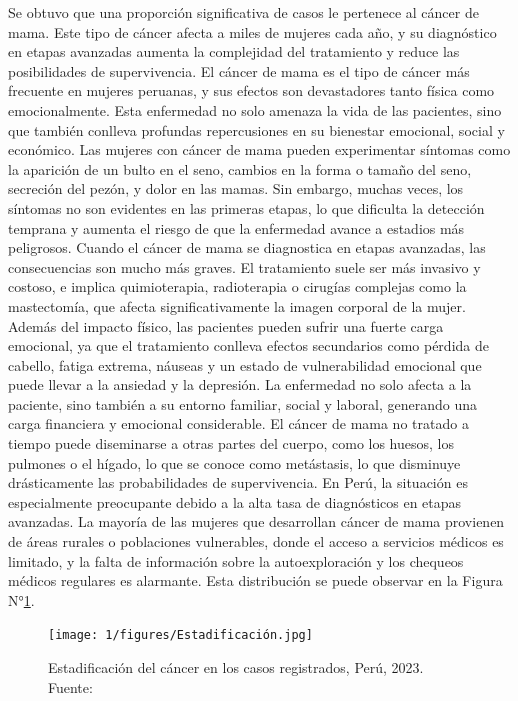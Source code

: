 Se obtuvo que una proporción significativa de casos le pertenece al cáncer de mama. Este tipo de cáncer afecta a miles de mujeres cada año, y su diagnóstico en etapas avanzadas aumenta la complejidad del tratamiento y reduce las posibilidades de supervivencia.
El cáncer de mama es el tipo de cáncer más frecuente en mujeres peruanas, y sus efectos son devastadores tanto física como emocionalmente. Esta enfermedad no solo amenaza la vida de las pacientes, sino que también conlleva profundas repercusiones en su bienestar emocional, social y económico. Las mujeres con cáncer de mama pueden experimentar síntomas como la aparición de un bulto en el seno, cambios en la forma o tamaño del seno, secreción del pezón, y dolor en las mamas. Sin embargo, muchas veces, los síntomas no son evidentes en las primeras etapas, lo que dificulta la detección temprana y aumenta el riesgo de que la enfermedad avance a estadios más peligrosos.
Cuando el cáncer de mama se diagnostica en etapas avanzadas, las consecuencias son mucho más graves. El tratamiento suele ser más invasivo y costoso, e implica quimioterapia, radioterapia o cirugías complejas como la mastectomía, que afecta significativamente la imagen corporal de la mujer. Además del impacto físico, las pacientes pueden sufrir una fuerte carga emocional, ya que el tratamiento conlleva efectos secundarios como pérdida de cabello, fatiga extrema, náuseas y un estado de vulnerabilidad emocional que puede llevar a la ansiedad y la depresión. La enfermedad no solo afecta a la paciente, sino también a su entorno familiar, social y laboral, generando una carga financiera y emocional considerable.
El cáncer de mama no tratado a tiempo puede diseminarse a otras partes del cuerpo, como los huesos, los pulmones o el hígado, lo que se conoce como metástasis, lo que disminuye drásticamente las probabilidades de supervivencia. En Perú, la situación es especialmente preocupante debido a la alta tasa de diagnósticos en etapas avanzadas. La mayoría de las mujeres que desarrollan cáncer de mama provienen de áreas rurales o poblaciones vulnerables, donde el acceso a servicios médicos es limitado, y la falta de información sobre la autoexploración y los chequeos médicos regulares es alarmante. Esta distribución se puede observar en la Figura N°\ref{5:fig}.
\begin{figure}[ht]
	\centering
	\texttt{[image: 1/figures/Estadificación.jpg]}
	\caption{Estadificación del cáncer en los casos registrados, Perú, 2023. Fuente: \cite{cdc2023cancer}}
	\label{5:fig}
\end{figure}
\vspace{0.5 cm}

